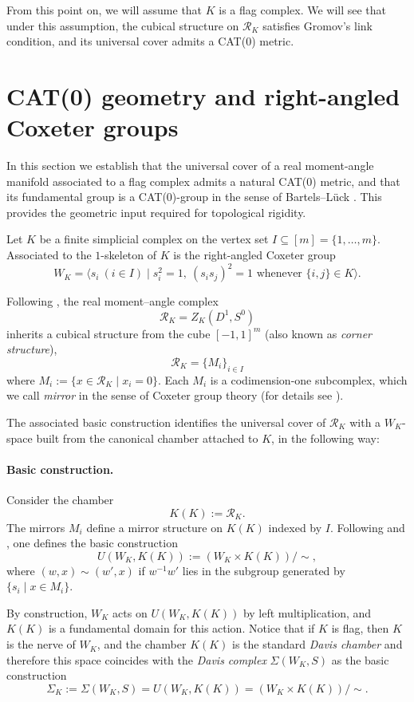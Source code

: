 \documentclass[11pt,a4paper]{article}
\numberwithin{equation}{section}
\theoremstyle{named}
\begin{document}
From this point on, we will assume that $K$ is a flag complex. We will see that under this assumption, the cubical structure on $\mathcal{R}_K$ satisfies Gromov's link condition, and its universal cover admits a CAT(0) metric.


\section{CAT(0) geometry and right-angled Coxeter groups}
\label{sec:cat0}

In this section we establish that the universal cover of a real moment-angle manifold associated to a flag complex admits a natural CAT(0) metric, and that its fundamental group is a CAT(0)-group in the sense of Bartels--Lück \cite{BartelsLuck2012}. This provides the geometric input required for topological rigidity.


Let $K$ be a finite simplicial complex on the vertex set $I\subseteq [m]=\{1,\dots,m\}$. Associated to the $1$-skeleton of $K$ is the right-angled Coxeter group
\[
W_K=\langle s_i \ (i\in I)\mid s_i^2=1,\ (s_is_j)^2=1 \text{ whenever } \{i,j\}\in K\rangle .
\]

Following \cite{dav, rafca}, the real moment--angle complex
\[
\mathcal{R}_K=Z_K(D^1,S^0)
\]
inherits a cubical structure from the cube $[-1,1]^m$ (also known as \emph{corner structure}),  
\[
\mathcal{R}_K=\{M_i\}_{i\in I}
\]
where \(M_i := \{ x \in \mathcal{R}_K \mid x_i = 0 \}\). Each $M_i$ is a codimension-one subcomplex, which we call \emph{mirror} in the sense of Coxeter group theory (for details see \cite[\S 1.1]{rafca}).

The associated basic construction identifies the universal cover of $\mathcal{R}_K$ with a $W_K$-space built from the canonical chamber attached to $K$, in the following way:

\paragraph*{Basic construction.} Consider the chamber
\[
K(K) := \mathcal{R}_K.
\]
The mirrors $M_i$ define a mirror structure on $K(K)$ indexed by $I$.
Following \cite{dav} and \cite[\S 1.5]{rafca}, one defines the basic construction
\[
U(W_K,K(K)) := (W_K \times K(K)) / \sim,
\]
where $(w,x) \sim (w',x)$ if $w^{-1}w'$ lies in the subgroup generated by $\{ s_i \mid x \in M_i \}$.

By construction, $W_K$ acts on $U(W_K,K(K))$ by left multiplication, and $K(K)$ is a fundamental domain for this action. Notice that if $K$ is flag, then $K$ is the nerve of $W_K$, and the chamber $K(K)$ is the standard \emph{Davis chamber} and therefore this space coincides with the \emph{Davis complex} $\Sigma(W_K,S)$ as the basic construction
\[
\Sigma_K:=\Sigma(W_K,S)=U(W_K,K(K))=(W_K\times K(K))/\sim.
\]
\end{document}
